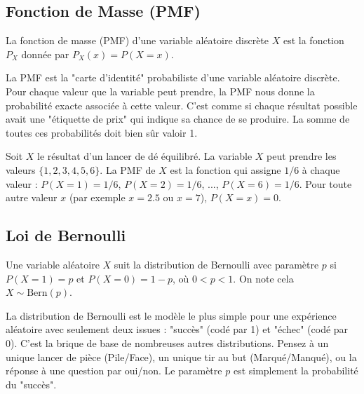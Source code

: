 \subsection{Fonction de Masse (PMF)}

\begin{definitionbox}
La fonction de masse (PMF) d'une variable aléatoire discrète $X$ est la fonction $P_X$ donnée par $P_X(x) = P(X=x)$.
\end{definitionbox}

\begin{intuitionbox}
La PMF est la "carte d'identité" probabiliste d'une variable aléatoire discrète. Pour chaque valeur que la variable peut prendre, la PMF nous donne la probabilité exacte associée à cette valeur. C'est comme si chaque résultat possible avait une "étiquette de prix" qui indique sa chance de se produire. La somme de toutes ces probabilités doit bien sûr valoir 1.
\end{intuitionbox}

\begin{examplebox}
Soit $X$ le résultat d'un lancer de dé équilibré. La variable $X$ peut prendre les valeurs $\{1, 2, 3, 4, 5, 6\}$.
La PMF de $X$ est la fonction qui assigne $1/6$ à chaque valeur :
$P(X=1) = 1/6$, $P(X=2) = 1/6$, ..., $P(X=6) = 1/6$.
Pour toute autre valeur $x$ (par exemple $x=2.5$ ou $x=7$), $P(X=x) = 0$.
\end{examplebox}

\subsection{Loi de Bernoulli}

\begin{definitionbox}
Une variable aléatoire $X$ suit la distribution de Bernoulli avec paramètre $p$ si $P(X=1) = p$ et $P(X=0) = 1-p$, où $0 < p < 1$. On note cela $X \sim \text{Bern}(p)$.
\end{definitionbox}

\begin{intuitionbox}
La distribution de Bernoulli est le modèle le plus simple pour une expérience aléatoire avec seulement deux issues : "succès" (codé par 1) et "échec" (codé par 0). C'est la brique de base de nombreuses autres distributions. Pensez à un unique lancer de pièce (Pile/Face), un unique tir au but (Marqué/Manqué), ou la réponse à une question par oui/non. Le paramètre $p$ est simplement la probabilité du "succès".
\end{intuitionbox}

